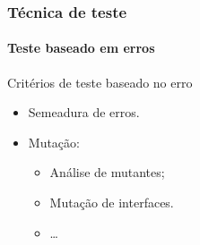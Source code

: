 \begin{frame}[hasprev=true, hasnext=false]
\frametitle{Técnica de teste}
\framesubtitle{Teste baseado em erros}
\label{concept:fault-based-test-criteria}

\begin{block:fact}{Critérios de teste baseado no erro}
\begin{itemize}
	\item Semeadura de erros.
	\item Mutação:
	\begin{itemize}
		\item Análise de mutantes;
		\item Mutação de interfaces.
		\item \ldots
	\end{itemize}
\end{itemize}
\end{block:fact}

\hfill
{}
\end{frame}